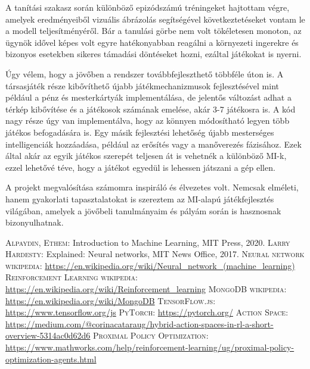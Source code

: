 \documentclass[
]{thesis-ekf}
\theoremstyle{definition}
\theoremstyle{remark}
\begin{document}
	A tanítási szakasz során különböző epizódszámú tréningeket hajtottam végre, amelyek eredményeiből vizuális ábrázolás segítségével következtetéseket vontam le a modell teljesítményéről. Bár a tanulási görbe nem volt tökéletesen monoton, az ügynök idővel képes volt egyre hatékonyabban reagálni a környezeti ingerekre és bizonyos esetekben sikeres támadási döntéseket hozni, ezáltal játékokat is nyerni. 
	
	Úgy vélem, hogy a jövőben a rendszer továbbfejleszthető többféle úton is. A társasjáték része kibővíthető újabb játékmechanizmusok fejlesztésével mint például a pénz és mesterkártyák implementálása, de jelentős változást adhat a térkép kibővítése és a játékosok számának emelése, akár 3-7 játékosra is. A kód nagy része úgy van implementálva, hogy az könnyen módosítható legyen több játékos befogadására is. Egy másik fejlesztési lehetőség újabb mesterséges intelligenciák hozzáadása, például az erősítés vagy a manőverezés fázisához. Ezek által akár az egyik játékos szerepét teljesen át is vehetnék a különböző MI-k, ezzel lehetővé téve, hogy a játékot egyedül is lehessen játszani a gép ellen.
	
	A projekt megvalósítása számomra inspiráló és élvezetes volt. Nemcsak elméleti, hanem gyakorlati tapasztalatokat is szereztem az MI-alapú játékfejlesztés világában, amelyek a jövőbeli tanulmányaim és pályám során is hasznosnak bizonyulhatnak. 
	
	\begin{thebibliography}{2}
		\textsc{Alpaydin, Ethem}: Introduction to Machine Learning, MIT Press, 2020.
		\textsc{Larry Hardesty}: Explained: Neural networks, MIT News Office, 2017. 
		\textsc{Neural network wikipedia}: \url{https://en.wikipedia.org/wiki/Neural\_network\_(machine\_learning)}
		\textsc{Reinforcement Learning wikipedia}: \url{https://en.wikipedia.org/wiki/Reinforcement\_learning}
		\textsc{MongoDB wikipedia}: \url{https://en.wikipedia.org/wiki/MongoDB}
		\textsc{TensorFlow.js}: \url{https://www.tensorflow.org/js}
		\textsc{PyTorch}: \url{https://pytorch.org/}
		\textsc{Action Space}: \url{https://medium.com/@corinacataraug/hybrid-action-spaces-in-rl-a-short-overview-5314ac0d62d6}
		\textsc{Proximal Policy Optimization}: \url{https://www.mathworks.com/help/reinforcement-learning/ug/proximal-policy-optimization-agents.html}
	\end{thebibliography}
	
	
	
\end{document}
